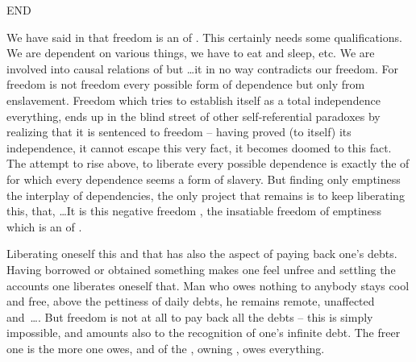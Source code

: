 {  END  }



\pa\label{pa:invfreedom} \inv %
We have said in  that freedom is an  of .  This
certainly needs some qualifications.  We are dependent on various things, we
have to eat and sleep, etc. We are involved into causal relations of  but \ldots it in no way contradicts our freedom. For freedom is not
freedom  every possible form of dependence but only from enslavement.
Freedom which tries to establish itself as a total independence 
everything, ends up in the blind street of other self-referential paradoxes by
realizing that it is sentenced to freedom -- having proved (to itself) its
independence, it cannot escape  this very fact, it becomes doomed to
this fact.  The attempt to rise
above, to liberate   every possible dependence is exactly
the  of  for which every dependence seems a form of slavery.
But finding only emptiness  the interplay of 
dependencies, the only project that remains is to keep liberating 
this,  that, \ldots It is this negative freedom ,
the insatiable freedom of emptiness which is an  of .

Liberating oneself  this and  that has also the aspect of
paying back one's debts. Having borrowed or obtained something makes one feel
unfree and settling the accounts one liberates oneself  that.  Man who
owes nothing to anybody stays cool and free, above the pettiness of daily debts,
he remains remote, unaffected and~\ldots {}.  But freedom is not at all to
pay back all the debts -- this is simply impossible, and 
amounts also to the recognition of one's infinite debt. The freer one is the
more one owes, and  of the , owning , owes
everything. 


